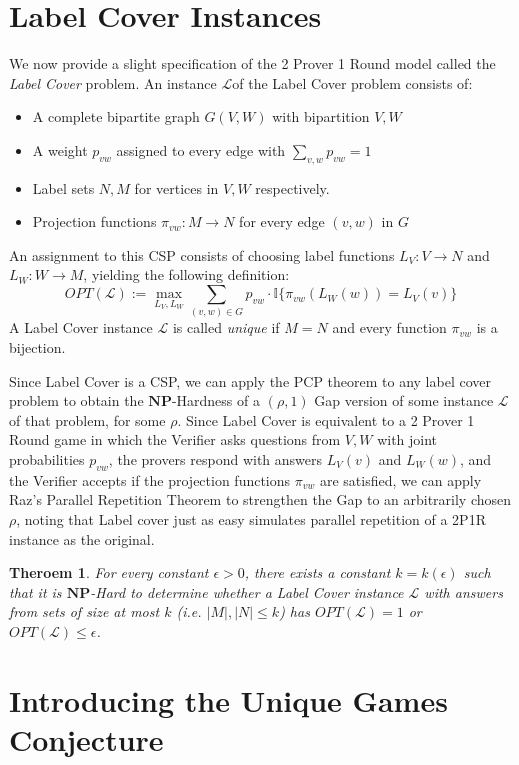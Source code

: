 \documentclass{article}
\newtheorem{theorem}{Theroem}
\newcommand{\NP}{\ensuremath{\mathbf{NP}}}
\newcommand{\e}{\epsilon}
\newcommand{\Ind}{\mathbb{I}}
\renewcommand{\L}{\ensuremath{\mathcal{L}}}
\newcommand{\OPT}{\ensuremath{\mathit{OPT}}}
\begin{document}
\section{Label Cover Instances}

We now provide a slight specification of the 2 Prover 1 Round model called the \textit{Label Cover} problem. An instance \L of the Label Cover problem consists of:
\begin{itemize}
\item A complete bipartite graph $G(V, W)$ with bipartition $V, W$
\item A weight $p_{vw}$ assigned to every edge with $\sum_{v, w}p_{vw} = 1$
\item Label sets $N, M$ for vertices in $V, W$ respectively.
\item Projection functions $\pi_{vw} : M \to N$ for every edge $(v, w)$ in $G$
\end{itemize}
An assignment to this CSP consists of choosing label functions $L_V: V \to N$ and $L_W: W \to M$, yielding the following definition:
\[OPT(\L) := \max_{L_V, L_W} \sum_{(v, w) \in G}p_{vw}\cdot\Ind\{\pi_{vw}(L_W(w)) = L_V(v)\}\]
A Label Cover instance $\L$ is called \textit{unique} if $M = N$ and every function $\pi_{vw}$ is a bijection.


Since Label Cover is a CSP, we can apply the PCP theorem to any label cover problem to obtain the \NP-Hardness of a $(\rho, 1)$ Gap version of some instance $\L$ of that problem, for some $\rho$. Since Label Cover is equivalent to a 2 Prover 1 Round game in which the Verifier asks questions from $V, W$ with joint probabilities $p_{vw}$, the provers respond with answers $L_V(v)$ and $L_W(w)$, and the Verifier accepts if the projection functions $\pi_{vw}$ are satisfied, we can apply Raz's Parallel Repetition Theorem to strengthen the Gap to an arbitrarily chosen $\rho$, noting that Label cover just as easy simulates parallel repetition of a 2P1R instance as the original.
\begin{theorem}
  For every constant $\e > 0$, there exists a constant $k = k(\e)$ such that it is \NP-Hard to determine whether a Label Cover instance $\L$ with answers from sets of size at most $k$ (i.e. $|M|, |N| \le k$) has $\OPT(\L) = 1$ or $\OPT(\L) \le \e$.
\end{theorem}

\section{Introducing the Unique Games Conjecture}
\end{document}
